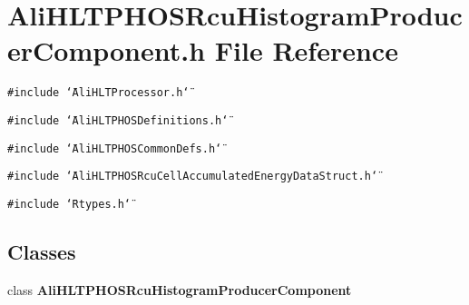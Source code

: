 \section{Ali\-HLTPHOSRcu\-Histogram\-Producer\-Component.h File Reference}
\label{AliHLTPHOSRcuHistogramProducerComponent_8h}


{\tt \#include \char`\"{}Ali\-HLTProcessor.h\char`\"{}}\par
{\tt \#include \char`\"{}Ali\-HLTPHOSDefinitions.h\char`\"{}}\par
{\tt \#include \char`\"{}Ali\-HLTPHOSCommon\-Defs.h\char`\"{}}\par
{\tt \#include \char`\"{}Ali\-HLTPHOSRcu\-Cell\-Accumulated\-Energy\-Data\-Struct.h\char`\"{}}\par
{\tt \#include \char`\"{}Rtypes.h\char`\"{}}\par
\subsection*{Classes}
\begin{CompactItemize}
\item 
class {\bf Ali\-HLTPHOSRcu\-Histogram\-Producer\-Component}
\end{CompactItemize}
